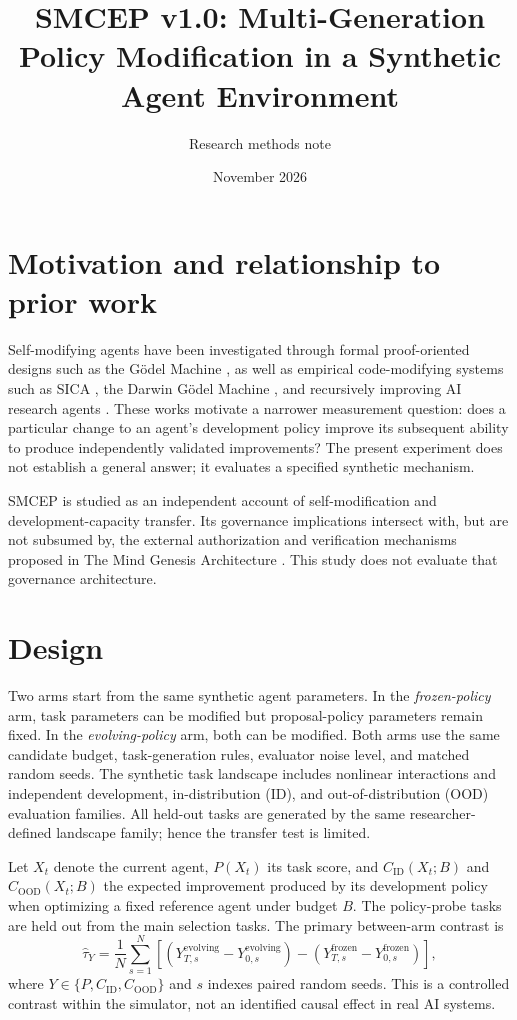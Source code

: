 \documentclass[11pt,a4paper]{article}
\title{SMCEP v1.0: Multi-Generation Policy Modification in a Synthetic Agent Environment}
\author{Research methods note}
\date{November 2026}
\begin{document}
\maketitle
\section{Motivation and relationship to prior work}
Self-modifying agents have been investigated through formal proof-oriented designs such as the G\"odel Machine \cite{schmidhuber2006}, as well as empirical code-modifying systems such as SICA \cite{robeyns2025}, the Darwin G\"odel Machine \cite{zhang2026}, and recursively improving AI research agents \cite{srikanth2026}. These works motivate a narrower measurement question: does a particular change to an agent's development policy improve its subsequent ability to produce independently validated improvements? The present experiment does not establish a general answer; it evaluates a specified synthetic mechanism.

SMCEP is studied as an independent account of self-modification and development-capacity transfer. Its governance implications intersect with, but are not subsumed by, the external authorization and verification mechanisms proposed in The Mind Genesis Architecture \cite{donmez2026}. This study does not evaluate that governance architecture.

\section{Design}
Two arms start from the same synthetic agent parameters. In the \emph{frozen-policy} arm, task parameters can be modified but proposal-policy parameters remain fixed. In the \emph{evolving-policy} arm, both can be modified. Both arms use the same candidate budget, task-generation rules, evaluator noise level, and matched random seeds. The synthetic task landscape includes nonlinear interactions and independent development, in-distribution (ID), and out-of-distribution (OOD) evaluation families. All held-out tasks are generated by the same researcher-defined landscape family; hence the transfer test is limited.

Let $X_t$ denote the current agent, $P(X_t)$ its task score, and $C_{\mathrm{ID}}(X_t;B)$ and $C_{\mathrm{OOD}}(X_t;B)$ the expected improvement produced by its development policy when optimizing a fixed reference agent under budget $B$. The policy-probe tasks are held out from the main selection tasks. The primary between-arm contrast is
\begin{equation}
\widehat\tau_Y=\frac{1}{N}\sum_{s=1}^{N}\left[(Y^{\mathrm{evolving}}_{T,s}-Y^{\mathrm{evolving}}_{0,s})-(Y^{\mathrm{frozen}}_{T,s}-Y^{\mathrm{frozen}}_{0,s})\right],
\end{equation}
where $Y\in\{P,C_{\mathrm{ID}},C_{\mathrm{OOD}}\}$ and $s$ indexes paired random seeds. This is a controlled contrast within the simulator, not an identified causal effect in real AI systems.
\end{document}
